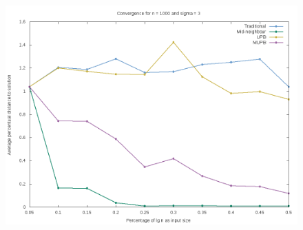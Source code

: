 \documentclass[12pt]{article}
\begin{document}
\begin{figure}[H]
        \centering
        \includegraphics[scale=.5]{convergence_plot_n1000_s3}
\end{figure}
\end{document}
